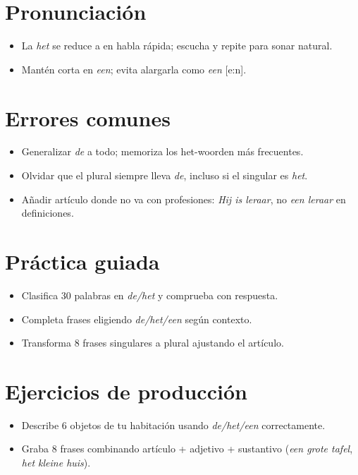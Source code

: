 \section{Pronunciación}
\begin{itemize}[leftmargin=*]
	\item La \textit{het} se reduce a  en habla rápida; escucha y repite para sonar natural.
	\item Mantén  corta en \textit{een}; evita alargarla como \textit{een} [e:n].
\end{itemize}

\section{Errores comunes}
\begin{itemize}[leftmargin=*]
	\item Generalizar \textit{de} a todo; memoriza los het-woorden más frecuentes.
	\item Olvidar que el plural siempre lleva \textit{de}, incluso si el singular es \textit{het}.
	\item Añadir artículo donde no va con profesiones: \textit{Hij is leraar}, no \textit{een leraar} en definiciones.
\end{itemize}

\section{Práctica guiada}
\begin{itemize}[leftmargin=*]
	\item Clasifica 30 palabras en \textit{de/het} y comprueba con respuesta.
	\item Completa frases eligiendo \textit{de/het/een} según contexto.
	\item Transforma 8 frases singulares a plural ajustando el artículo.
\end{itemize}

\section{Ejercicios de producción}
\begin{itemize}[leftmargin=*]
	\item Describe 6 objetos de tu habitación usando \textit{de/het/een} correctamente.
	\item Graba 8 frases combinando artículo + adjetivo + sustantivo (\textit{een grote tafel}, \textit{het kleine huis}).
\end{itemize}

